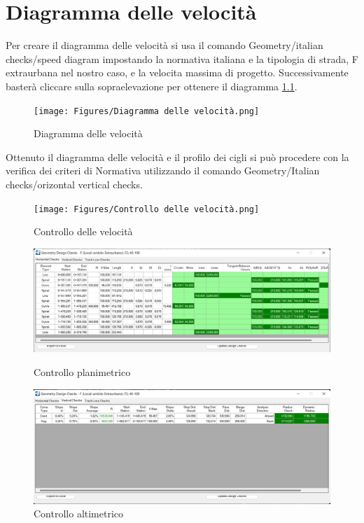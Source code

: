 \chapter{Diagramma delle velocità}

Per creare il diagramma delle velocità si usa il comando Geometry/italian checks/speed diagram impostando la normativa italiana e la tipologia di strada, F extraurbana nel nostro caso, e la velocita massima di progetto. Successivamente basterà cliccare sulla sopraelevazione per ottenere il diagramma \ref{Diagramma delle velocità}.

\begin{figure}[H]
    \texttt{[image: Figures/Diagramma delle velocità.png]}
      \caption{Diagramma delle velocità}
      \label{Diagramma delle velocità}
\end{figure}

Ottenuto il diagramma delle velocità e il profilo dei cigli si può procedere con la verifica  dei criteri di Normativa utilizzando il comando Geometry/Italian checks/orizontal vertical checks.

\begin{figure}[H]
    \texttt{[image: Figures/Controllo delle velocità.png]}
      \caption{Controllo delle velocità}
      \label{Controllo delle velocità}
\end{figure}

\begin{figure}[H]
    \centering
    \begin{minipage}[b]{0.45\textwidth}
      \includegraphics[width=\textwidth]{Figures/Controllo planimetrico.png}
      \caption{Controllo planimetrico}
      \label{Controllo planimetrico}
    \end{minipage}
    \hfill
    \begin{minipage}[b]{0.45\textwidth}
      \includegraphics[width=\textwidth]{Figures/Controllo altimetrico.png}
      \caption{Controllo altimetrico}
      \label{Controllo altimetrico}
    \end{minipage}
  \end{figure}

